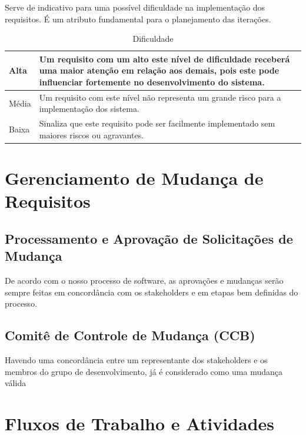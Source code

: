 \begin{apendicesenv}
Serve de indicativo para uma possível dificuldade na implementação dos requisitos. É um atributo fundamental para o planejamento das iterações.

\begin{table}[!h]
\centering
\caption{Dificuldade}
\label{attr_Dificuldade}
\begin{tabular}{|p{2cm}|p{8cm}|}
\hline
Alta  & Um requisito com um alto este nível de dificuldade receberá uma maior atenção em relação aos demais, pois este pode influenciar fortemente no desenvolvimento do sistema. \\ \hline
Média & Um requisito com este nível não representa um grande risco para a implementação dos sistema.                                                                              \\ \hline
Baixa & Sinaliza que este requisito pode ser facilmente implementado sem maiores riscos ou agravantes.                                                                            \\ \hline
\end{tabular}
\end{table}

\section{Gerenciamento de Mudança de Requisitos}

\subsection{Processamento e Aprovação de Solicitações de Mudança}

De acordo com o nosso processo de software, as aprovações e mudanças serão sempre feitas em concordância com os stakeholders e em etapas bem definidas do processo.

\subsection{Comitê de Controle de Mudança (CCB)}

Havendo uma concordância entre um representante dos stakeholders e os membros do grupo de desenvolvimento, já é considerado como uma mudança válida

\section{Fluxos de Trabalho e Atividades}


\end{apendicesenv}
